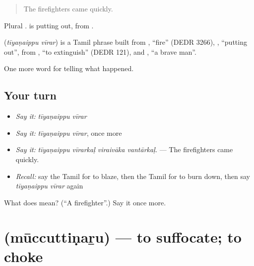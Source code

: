 \begin{quote}
The firefighters came quickly.
\end{quote}

Plural  .  is putting out, from .

\begin{cousinweb}
\textbf{ } (\emph{tīyaṇaippu vīrar}) is a Tamil phrase built from , \textquotedblleft{}fire\textquotedblright{} (DEDR 3266), , \textquotedblleft{}putting out\textquotedblright{}, from , \textquotedblleft{}to extinguish\textquotedblright{} (DEDR 121), and , \textquotedblleft{}a brave man\textquotedblright{}.
\end{cousinweb}

\begin{grammarlens}[title={What you've built}]
One more word for telling what happened.
\end{grammarlens}

\subsection*{Your turn}
\begin{itemize}
\raggedright
  \item \emph{Say it:} \emph{tīyaṇaippu vīrar}
  \item \emph{Say it:} \emph{tīyaṇaippu vīrar}, once more
  \item \emph{Say it:} \emph{tīyaṇaippu vīrarkaḷ viraivāka vantārkaḷ.} — The firefighters came quickly.
  \item \emph{Recall:} say the Tamil for to blaze, then the Tamil for to burn down, then say \emph{tīyaṇaippu vīrar} again
\end{itemize}

\begin{tcolorbox}[breakable,colback=teal!4,colframe=teal!35!black,title={Before you move on}]
What does   mean? (\textquotedblleft{}A firefighter\textquotedblright{}.) Say it once more.
\end{tcolorbox}
\section[\texorpdfstring{\ta{மூச்சுத்திணறு} (mūccuttiṇaṟu)}{மூச்சுத்திணறு (mūccuttiṇaṟu)}]{ (mūccuttiṇaṟu) — to suffocate; to choke}

\label{lesson:TA-C299-muccuttinaru}



